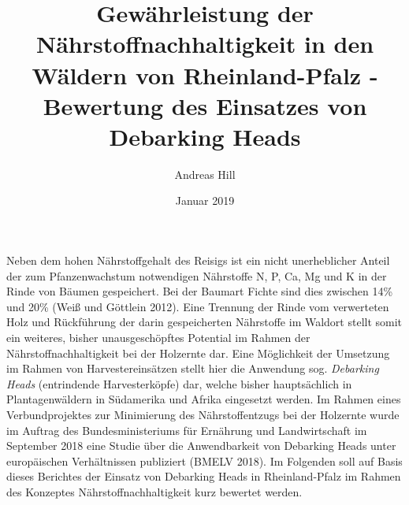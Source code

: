 \documentclass[a4paper, 11pt, titlepage]{scrartcl} %
\author[*]{\large Andreas Hill}
\affil[*]{\normalsize Forstreferendar, Landesforsten Rheinland-Pfalz}
\date{Januar 2019}
\title{\LARGE Gewährleistung der Nährstoffnachhaltigkeit in den Wäldern von Rheinland-Pfalz - Bewertung des Einsatzes von Debarking Heads \vspace{-1.5ex}}
\begin{document}
\sloppy

\maketitle

%
%
%
%
%
%

\pagestyle{plain} %
\setlength{\headsep}{10mm}

\setcounter{page}{1}



Neben dem hohen Nährstoffgehalt des Reisigs ist ein nicht unerheblicher Anteil der zum Pfanzenwachstum notwendigen Nährstoffe N, P, Ca, Mg und K in der Rinde von Bäumen gespeichert. Bei der Baumart Fichte sind dies zwischen 14\% und 20\% (Weiß und Göttlein 2012). Eine Trennung der Rinde vom verwerteten Holz und Rückführung der darin gespeicherten Nährstoffe im Waldort stellt somit ein weiteres, bisher unausgeschöpftes Potential im Rahmen der Nährstoffnachhaltigkeit bei der Holzernte dar. Eine Möglichkeit der Umsetzung im Rahmen von Harvestereinsätzen stellt hier die Anwendung sog. \textit{Debarking Heads} (entrindende Harvesterköpfe) dar, welche bisher hauptsächlich in Plantagenwäldern in Südamerika und Afrika eingesetzt werden. Im Rahmen eines Verbundprojektes zur Minimierung des Nährstoffentzugs bei der Holzernte wurde im Auftrag des Bundesministeriums für Ernährung und Landwirtschaft im September 2018 eine Studie über die Anwendbarkeit von Debarking Heads unter europäischen Verhältnissen publiziert (BMELV 2018). Im Folgenden soll auf Basis dieses Berichtes der Einsatz von Debarking Heads in Rheinland-Pfalz im Rahmen des Konzeptes Nährstoffnachhaltigkeit kurz bewertet werden.\\
\end{document}
